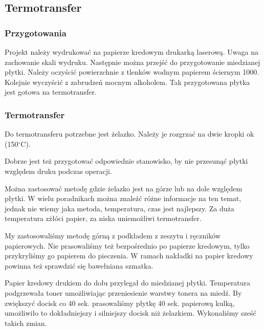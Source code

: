 \documentclass[a4paper,11pt]{article}
\begin{document}
\subsection{Termotransfer}
\subsubsection{Przygotowania}
Projekt należy wydrukować na papierze kredowym drukarką laserową. Uwaga na zachowanie skali wydruku. Następnie można przejść do przygotowanie miedzianej płytki. Należy oczyścić powierzchnie z tlenków wodnym papierem ściernym 1000. Kolejnie wyczyścić z zabrudzeń mocnym alkoholem. Tak przygotowana płytka jest gotowa na termotransfer.
\subsubsection{Termotransfer}
Do termotransferu potrzebne jest żelazko. Należy je rozgrzać na dwie kropki ok (150$^\circ$C).

Dobrze jest też przygotować odpowiednie stanowisko, by nie przesunąć płytki względem druku podczas operacji.

Można zastosować metodę gdzie żelazko jest na górze lub na dole względem płytki. W wielu poradnikach można znaleźć różne informacje na ten temat, jednak nie wiemy jaka metoda, temperatura, czas jest najlepszy. Za duża temperatura zżłóci papier, za niska uniemożliwi termotransfer.

My zastosowaliśmy metodę górną z podkładem z zeszytu i ręczników papierowych. Nie prasowaliśmy też bezpośrednio po papierze kredowym, tylko przykryliśmy go papierem do pieczenia. W ramach nakładki na papier kredowy powinna też sprawdzić się bawełniana szmatka.

Papier kredowy drukiem do dołu przylegał do miedzianej płytki. Temperatura podgrzewała toner umożliwiając przeniesienie warstwy tonera na miedź. By zwiększyć docisk co 40 sek. prasowaliśmy płytkę 40 sek. papierową kulką, umożliwiło to dokładniejszy i silniejszy docisk niż żelazkiem. Wykonaliśmy sześć takich zmian.
\end{document}
